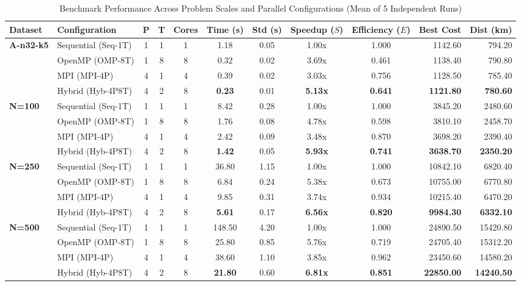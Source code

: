 \documentclass[runningheads]{llncs}
\begin{document}
\begin{table}[t]
\centering
\caption{Benchmark Performance Across Problem Scales and Parallel Configurations (Mean of 5 Independent Runs)}
\label{tab:full_results}
\setlength{\tabcolsep}{3pt}
\begin{adjustbox}{width=\textwidth,center}
\begin{tabular}{llcccccccrr}
\toprule
\textbf{Dataset} & \textbf{Configuration} & \textbf{P} & \textbf{T} & \textbf{Cores} & \textbf{Time (s)} & \textbf{Std (s)} & \textbf{Speedup ($S$)} & \textbf{Efficiency ($E$)} & \textbf{Best Cost} & \textbf{Dist (km)} \\
\midrule
\multirow{4}{*}{\textbf{A-n32-k5}} 
 & Sequential (Seq-1T)  & 1 & 1 & 1 & 1.18 & 0.05 & 1.00x & 1.000 & 1142.60 & 794.20 \\
 & OpenMP (OMP-8T)      & 1 & 8 & 8 & 0.32 & 0.02 & 3.69x & 0.461 & 1138.40 & 790.80 \\
 & MPI (MPI-4P)         & 4 & 1 & 4 & 0.39 & 0.02 & 3.03x & 0.756 & 1128.50 & 785.40 \\
 & Hybrid (Hyb-4P8T)    & 4 & 2 & 8 & \textbf{0.23} & 0.01 & \textbf{5.13x} & \textbf{0.641} & \textbf{1121.80} & \textbf{780.60} \\
\midrule
\multirow{4}{*}{\textbf{N=100}} 
 & Sequential (Seq-1T)  & 1 & 1 & 1 & 8.42 & 0.28 & 1.00x & 1.000 & 3845.20 & 2480.60 \\
 & OpenMP (OMP-8T)      & 1 & 8 & 8 & 1.76 & 0.08 & 4.78x & 0.598 & 3810.10 & 2458.70 \\
 & MPI (MPI-4P)         & 4 & 1 & 4 & 2.42 & 0.09 & 3.48x & 0.870 & 3698.20 & 2390.40 \\
 & Hybrid (Hyb-4P8T)    & 4 & 2 & 8 & \textbf{1.42} & 0.05 & \textbf{5.93x} & \textbf{0.741} & \textbf{3638.70} & \textbf{2350.20} \\
\midrule
\multirow{4}{*}{\textbf{N=250}} 
 & Sequential (Seq-1T)  & 1 & 1 & 1 & 36.80 & 1.15 & 1.00x & 1.000 & 10842.10 & 6820.40 \\
 & OpenMP (OMP-8T)      & 1 & 8 & 8 & 6.84 & 0.24 & 5.38x & 0.673 & 10755.00 & 6770.80 \\
 & MPI (MPI-4P)         & 4 & 1 & 4 & 9.85 & 0.31 & 3.74x & 0.934 & 10215.40 & 6470.20 \\
 & Hybrid (Hyb-4P8T)    & 4 & 2 & 8 & \textbf{5.61} & 0.17 & \textbf{6.56x} & \textbf{0.820} & \textbf{9984.30} & \textbf{6332.10} \\
\midrule
\multirow{4}{*}{\textbf{N=500}} 
 & Sequential (Seq-1T)  & 1 & 1 & 1 & 148.50 & 4.20 & 1.00x & 1.000 & 24890.50 & 15420.80 \\
 & OpenMP (OMP-8T)      & 1 & 8 & 8 & 25.80 & 0.85 & 5.76x & 0.719 & 24705.40 & 15312.20 \\
 & MPI (MPI-4P)         & 4 & 1 & 4 & 38.60 & 1.10 & 3.85x & 0.962 & 23450.60 & 14580.20 \\
 & Hybrid (Hyb-4P8T)    & 4 & 2 & 8 & \textbf{21.80} & 0.60 & \textbf{6.81x} & \textbf{0.851} & \textbf{22850.00} & \textbf{14240.50} \\
\bottomrule
\end{tabular}
\end{adjustbox}
\end{table}
\end{document}
